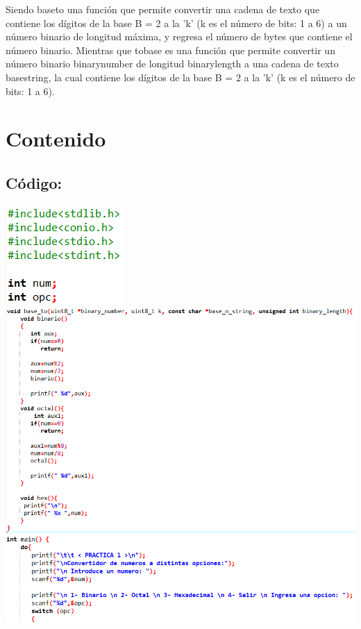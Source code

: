 \documentclass[conference]{IEEEtran}
\begin{document}
Siendo baseto una función que permite convertir una cadena de texto que contiene los dígitos de la base B = 2 a la 'k' (k es el número de bits: 1 a 6) a un número binario de longitud máxima, y regresa el número de bytes que contiene el número binario. Mientras que tobase es una función que permite convertir un número binario binarynumber de longitud binarylength a una cadena de texto basestring, la cual contiene los dígitos de la base B = 2 a la 'k' (k es el número de bits: 1 a 6).

\section{Contenido}
\subsection{Código:}
\includegraphics{e2} \\
\includegraphics{e3} \\
\includegraphics{e4} \\
\end{document}
